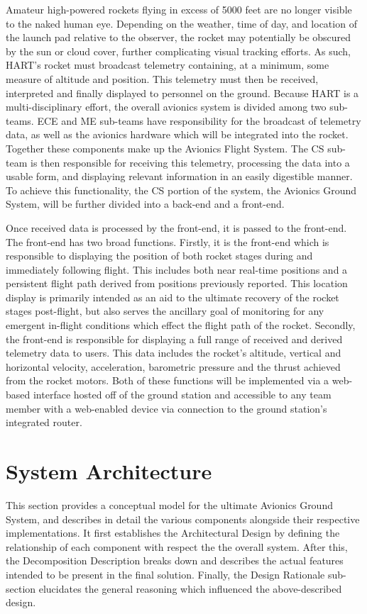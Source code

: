\documentclass[journal,10pt,onecolumn,compsoc]{IEEEtran}
\begin{document}
	\noindent Amateur high-powered rockets flying in excess of 5000 feet are no longer visible to the naked human eye. 
	Depending on the weather, time of day, and location of the launch pad relative to the observer, the rocket may potentially be obscured by the sun or cloud cover, further complicating visual tracking efforts. 
	As such, HART's rocket must broadcast telemetry containing, at a minimum, some measure of altitude and position.
	This telemetry must then be received, interpreted and finally displayed to personnel on the ground.
	Because HART is a multi-disciplinary effort, the overall avionics system is divided among two sub-teams.
	ECE and ME sub-teams have responsibility for the broadcast of telemetry data, as well as the avionics hardware which will be integrated into the rocket.
	Together these components make up the Avionics Flight System.
	The CS sub-team is then responsible for receiving this telemetry, processing the data into a usable form, and displaying relevant information in an easily digestible manner.
	To achieve this functionality, the CS portion of the system, the Avionics Ground System, will be further divided into a back-end and a front-end.
  

	\noindent Once received data is processed by the front-end, it is passed to the front-end.
	The front-end has two broad functions.
	Firstly, it is the front-end which is responsible to displaying the position of both rocket stages during and immediately following flight.
	This includes both near real-time positions and a persistent flight path derived from positions previously reported.
	This location display is primarily intended as an aid to the ultimate recovery of the rocket stages post-flight, but also serves the ancillary goal of monitoring for any emergent in-flight conditions which effect the flight path of the rocket.
	Secondly, the front-end is responsible for displaying a full range of received and derived telemetry data to users.
	This data includes the rocket’s altitude, vertical and horizontal velocity, acceleration, barometric pressure and the thrust achieved from the rocket motors.
	Both of these functions will be implemented via a web-based interface hosted off of the ground station and accessible to any team member with a web-enabled device via connection to the ground station's integrated router. 


\section{System Architecture}
	\noindent This section provides a conceptual model for the ultimate Avionics Ground System, and describes in detail the various components alongside their respective implementations.
	It first establishes the Architectural Design by defining the relationship of each component with respect the the overall system.
	After this, the Decomposition Description breaks down and describes the actual features intended to be present in the final solution.
	Finally, the Design Rationale sub-section elucidates the general reasoning which influenced the above-described design.
\end{document}
